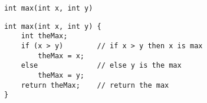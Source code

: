\begin{frame}[fragile,label=maxC]{\texttt{int max(int x, int y)}}
\lstset{
    language=C++,
    style=small,
}
\begin{lstlisting}
int max(int x, int y) {
    int theMax;
    if (x > y)        // if x > y then x is max
        theMax = x;
    else              // else y is the max
        theMax = y;
    return theMax;    // return the max
}
\end{lstlisting}
\end{frame}

